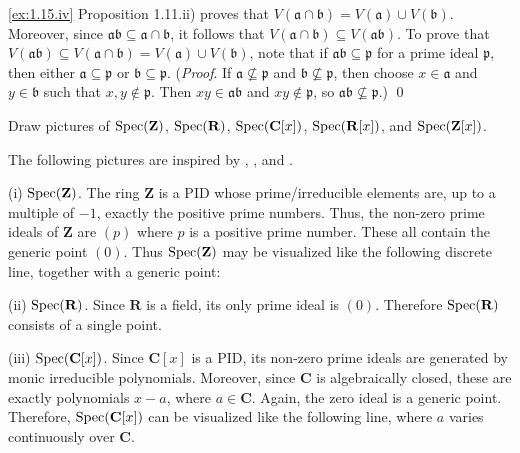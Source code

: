 \noindent
\ref{ex:1.15.iv}
Proposition 1.11.ii) proves that $V(\mathfrak a \cap \mathfrak b) = V(\mathfrak a) \cup V(\mathfrak b)$.
Moreover, since $\mathfrak a \mathfrak b \subseteq \mathfrak a \cap \mathfrak b$, it follows that $V(\mathfrak a \cap \mathfrak b) \subseteq V(\mathfrak a \mathfrak b)$.
To prove that $V(\mathfrak a\mathfrak b) \subseteq V(\mathfrak a \cap \mathfrak b) = V(\mathfrak a) \cup V(\mathfrak b)$, note that if $\mathfrak a \mathfrak b \subseteq \mathfrak p$ for a prime ideal $\mathfrak p$, then either $\mathfrak a \subseteq \mathfrak p$ or $\mathfrak b \subseteq \mathfrak p$. (\emph{Proof}. If $\mathfrak a \not\subseteq\mathfrak p$ and $\mathfrak b \not\subseteq \mathfrak p$, then choose $x\in\mathfrak a$ and $y\in\mathfrak b$ such that $x,y\notin\mathfrak p$.
Then $x y \in\mathfrak a \mathfrak b$ and $xy \notin\mathfrak p$, so $\mathfrak a\mathfrak b \not\subseteq \mathfrak p$.)
\qed

\begin{exercise}
\label{ex:1.16}
Draw pictures of $\operatorname{Spec}(\mathbf Z)$, $\operatorname{Spec}(\mathbf R)$, $\operatorname{Spec}(\mathbf C[x])$, $\operatorname{Spec}(\mathbf R[x])$, and $\operatorname{Spec}(\mathbf Z[x])$.
\end{exercise}

\noindent
The following pictures are inspired by \cite[Chapter II]{EisenbudHarrisGeometryOfSchemes},  \cite[Chapter II, \S1]{MumfordRedBook}, and \cite[Chapter 3]{VakilNotes}.

\noindent
(i) $\operatorname{Spec}(\mathbf Z)$.
The ring $\mathbf Z$ is a PID whose prime/irreducible elements are, up to a multiple of $-1$, exactly the positive prime numbers.
Thus, the non-zero prime ideals of $\mathbf Z$ are $(p)$ where $p$ is a positive prime number.
These all contain the generic point $(0)$.
Thus $\operatorname{Spec}(\mathbf Z)$ may be visualized like the following discrete line, together with a generic point:


\noindent
(ii) $\operatorname{Spec}(\mathbf R)$.
Since $\mathbf R$ is a field, its only prime ideal is $(0)$.
Therefore $\operatorname{Spec}(\mathbf R)$ consists of a single point.

\noindent
(iii) $\operatorname{Spec}(\mathbf C[x])$.
Since $\mathbf C[x]$ is a PID, its non-zero prime ideals are generated by monic irreducible polynomials.
Moreover, since $\mathbf C$ is algebraically closed, these are exactly polynomials $x - a$, where $a \in \mathbf C$.
Again, the zero ideal is a generic point.
Therefore, $\operatorname{Spec}(\mathbf C[x])$ can be visualized like the following line, where $a$ varies continuously over $\mathbf C$.
 

